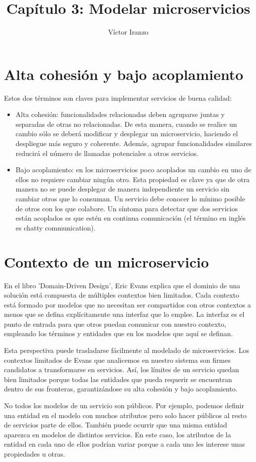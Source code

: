 \documentclass[11pt,a4paper]{article}
\author{Víctor Iranzo}
\title{Capítulo 3: Modelar microservicios}
\begin{document}
\maketitle

\section{Alta cohesión y bajo acoplamiento}

Estos dos términos son claves para implementar servicios de buena calidad:

\begin{itemize}

\item Alta cohesión: funcionalidades relacionadas deben agruparse juntas y separadas de otras no relacionadas. De esta manera, cuando se realice un cambio sólo se deberá modificar y desplegar un microservicio, haciendo el despliegue más seguro y coherente. Además, agrupar funcionalidades similares reducirá el número de llamadas potenciales a otros servicios.

\item Bajo acoplamiento: en los microservicios poco acoplados un cambio en uno de ellos no requiere cambiar ningún otro. Esta propiedad es clave ya que de otra manera no se puede desplegar de manera independiente un servicio sin cambiar otros que lo consuman. Un servicio debe conocer lo mínimo posible de otros con los que colabore. Un síntoma para detectar que dos servicios están acoplados es que estén en continua comunicación (el término en inglés es chatty communication).

\end{itemize}

\section{Contexto de un microservicio}

En el libro 'Domain-Driven Design', Eric Evans explica que el dominio de una solución está compuesta de múltiples contextos bien limitados. Cada contexto está formado por modelos que no necesitan ser compartidos con otros contextos a menos que se defina explícitamente una interfaz que lo emplee. La interfaz es el punto de entrada para que otros puedan comunicar con nuestro contexto, empleando los términos y entidades que en los modelos que aquí se definan.

Esta perspectiva puede trasladarse fácilmente al modelado de microservicios. Los contextos limitados de Evans que analicemos en nuestro sistema son firmes candidatos a transformarse en servicios. Así, los límites de un servicio quedan bien limitados porque  todas las entidades que pueda requerir se encuentran dentro de sus fronteras, garantizándose su alta cohesión y bajo acoplamiento.

No todos los modelos de un servicio son públicos. Por ejemplo, podemos definir una entidad en el modelo con muchos atributos pero solo hacer públicos al resto de servicios parte de ellos. También puede ocurrir que una misma entidad aparezca en modelos de distintos servicios. En este caso, los atributos de la entidad en cada uno de ellos podrían variar porque a cada uno les interese unas propiedades u otras.
\end{document}
